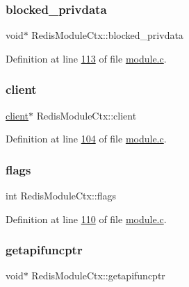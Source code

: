 \subsubsection{\texorpdfstring{blocked\+\_\+privdata}{blocked\_privdata}}
{\footnotesize\ttfamily void$\ast$ Redis\+Module\+Ctx\+::blocked\+\_\+privdata}



Definition at line \hyperlink{module_8c_source_l00113}{113} of file \hyperlink{module_8c_source}{module.\+c}.

\mbox{\label{structRedisModuleCtx_a6611174e7e278988753fb5315a91358b}} 
\subsubsection{\texorpdfstring{client}{client}}
{\footnotesize\ttfamily \hyperlink{structclient}{client}$\ast$ Redis\+Module\+Ctx\+::client}



Definition at line \hyperlink{module_8c_source_l00104}{104} of file \hyperlink{module_8c_source}{module.\+c}.

\mbox{\label{structRedisModuleCtx_abbfd3bcd0414e1a62a4c16c7adb2801a}} 
\subsubsection{\texorpdfstring{flags}{flags}}
{\footnotesize\ttfamily int Redis\+Module\+Ctx\+::flags}



Definition at line \hyperlink{module_8c_source_l00110}{110} of file \hyperlink{module_8c_source}{module.\+c}.

\mbox{\label{structRedisModuleCtx_a9d053af6af362dd108a36b202784ff05}} 
\subsubsection{\texorpdfstring{getapifuncptr}{getapifuncptr}}
{\footnotesize\ttfamily void$\ast$ Redis\+Module\+Ctx\+::getapifuncptr}



